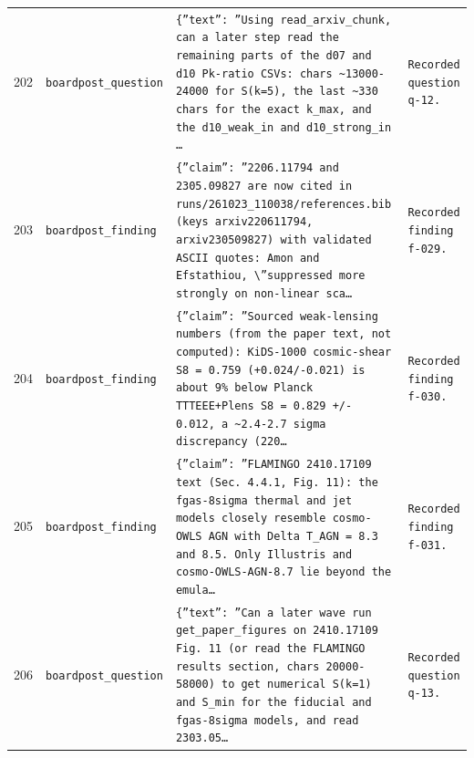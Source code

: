\documentclass[11pt,a4paper]{article}
\begin{document}
\begin{longtable}{@{}p{}p{}p{}p{}@{}}
202 & \texttt{board}\newline\texttt{post\_\allowbreak{}question} & \texttt{\{''text'':\allowbreak{} ''Using read\_\allowbreak{}arxiv\_\allowbreak{}chunk,\allowbreak{} can a later step read the remaining parts of the d07 and d10 Pk-ratio CSVs:\allowbreak{} chars \textasciitilde{}\allowbreak{}13000-24000 for S(k=\allowbreak{}5)\allowbreak{},\allowbreak{} the last \textasciitilde{}\allowbreak{}330 chars for the exact k\_\allowbreak{}max,\allowbreak{} and the d10\_\allowbreak{}weak\_\allowbreak{}in and d10\_\allowbreak{}strong\_\allowbreak{}in \ldots{}\allowbreak{}} & \texttt{Recorded question q-12.} \\
203 & \texttt{board}\newline\texttt{post\_\allowbreak{}finding} & \texttt{\{''claim'':\allowbreak{} ''2206.11794 and 2305.09827 are now cited in runs/\allowbreak{}261023\_\allowbreak{}110038/\allowbreak{}references.bib (keys arxiv220611794,\allowbreak{} arxiv230509827)\allowbreak{} with validated ASCII quotes:\allowbreak{} Amon and Efstathiou,\allowbreak{} \textbackslash{}\allowbreak{}''suppressed more strongly on non-linear sca\ldots{}\allowbreak{}} & \texttt{Recorded finding f-029.} \\
204 & \texttt{board}\newline\texttt{post\_\allowbreak{}finding} & \texttt{\{''claim'':\allowbreak{} ''Sourced weak-lensing numbers (from the paper text,\allowbreak{} not computed)\allowbreak{}:\allowbreak{} KiDS-1000 cosmic-shear S8 =\allowbreak{} 0.759 (+0.024/\allowbreak{}-0.021)\allowbreak{} is about 9\% below Planck TTTEEE+Plens S8 =\allowbreak{} 0.829 +/\allowbreak{}- 0.012,\allowbreak{} a \textasciitilde{}\allowbreak{}2.4-2.7 sigma discrepancy (220\ldots{}\allowbreak{}} & \texttt{Recorded finding f-030.} \\
205 & \texttt{board}\newline\texttt{post\_\allowbreak{}finding} & \texttt{\{''claim'':\allowbreak{} ''FLAMINGO 2410.17109 text (Sec. 4.4.1,\allowbreak{} Fig. 11)\allowbreak{}:\allowbreak{} the fgas-8sigma thermal and jet models closely resemble cosmo-OWLS AGN with Delta T\_\allowbreak{}AGN =\allowbreak{} 8.3 and 8.5. Only Illustris and cosmo-OWLS-AGN-8.7 lie beyond the emula\ldots{}\allowbreak{}} & \texttt{Recorded finding f-031.} \\
206 & \texttt{board}\newline\texttt{post\_\allowbreak{}question} & \texttt{\{''text'':\allowbreak{} ''Can a later wave run get\_\allowbreak{}paper\_\allowbreak{}figures on 2410.17109 Fig. 11 (or read the FLAMINGO results section,\allowbreak{} chars 20000-58000)\allowbreak{} to get numerical S(k=\allowbreak{}1)\allowbreak{} and S\_\allowbreak{}min for the fiducial and fgas-8sigma models,\allowbreak{} and read 2303.05\ldots{}\allowbreak{}} & \texttt{Recorded question q-13.} \\

\end{longtable}
\end{document}
